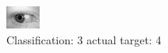 \begin{figure}[h!]
\begin{center}
\includegraphics[width=0.60\columnwidth]{figures/ID697_class_3_target_4.png}
\end{center}
\caption{ Classification: 3 actual target: 4}
\label{fig:ID697_class_3_target_4}
\end{figure}
